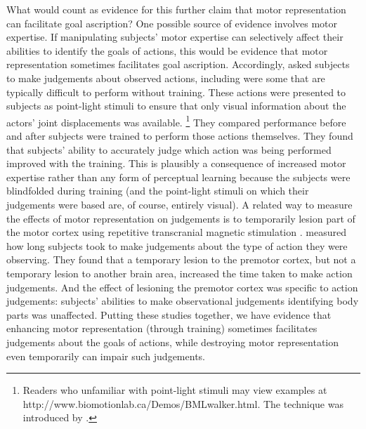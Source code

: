 \documentclass[12pt,\papersize]{extarticle}
\begin{document}
What would count as evidence for this further claim that motor representation can facilitate goal ascription?  One possible source of evidence involves motor expertise. If manipulating subjects' motor expertise can selectively affect their abilities to identify the goals of actions, this would be evidence that motor representation sometimes facilitates goal ascription.  Accordingly, \citet{casile:2006_nonvisual} asked subjects to make judgements about observed actions, including were some that are typically difficult to perform without training.  These actions were presented to subjects as point-light stimuli to ensure that only visual information about the actors' joint displacements was available.%
\footnote{
Readers who unfamiliar with point-light stimuli may view examples at http://www.biomotionlab.ca/Demos/BMLwalker.html.
The technique was introduced by \citet{johansson:1973_visual}.
}
They compared performance before and after subjects were trained to perform those actions themselves. They found that subjects' ability to accurately judge which action was being performed improved with the training. This is plausibly a consequence of increased motor expertise rather than any form of perceptual learning because the subjects were blindfolded during training (and the point-light stimuli on which their judgements were based are, of course, entirely visual). A related way to measure the effects of motor representation on judgements is to temporarily lesion part of the motor cortex using repetitive transcranial magnetic stimulation  \citep{urgesi:2007_representation, moro:2008_neural}.  \citet{urgesi:2007_representation} measured how long subjects took to make judgements about the type of action they were observing. They found that a temporary lesion to the premotor cortex, but not a temporary lesion to another brain area, increased the time taken to make action judgements. And the effect of lesioning the premotor cortex was specific to action judgements: subjects' abilities to make observational judgements identifying body parts was unaffected. Putting these studies together, we have evidence that enhancing motor representation (through training) sometimes facilitates judgements about the goals of actions, while destroying motor representation even temporarily can impair such judgements.
\end{document}
